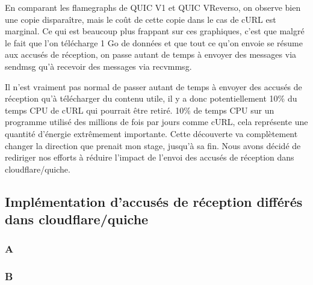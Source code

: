En comparant les flamegraphs de QUIC V1 et QUIC VReverso, on observe bien une copie disparaître, mais le coût de cette copie dans le cas de cURL est marginal. Ce qui est beaucoup plus frappant sur ces graphiques, c'est que malgré le fait que l'on télécharge 1 Go de données et que tout ce qu'on envoie se résume aux accusés de réception, on passe autant de temps à envoyer des messages via sendmsg qu'à recevoir des messages via recvmmsg.

\vspace{0.5cm}

Il n'est vraiment pas normal de passer autant de temps à envoyer des accusés de réception qu'à télécharger du contenu utile, il y a donc potentiellement 10\% du temps CPU de cURL qui pourrait être retiré. 10\% de temps CPU sur un programme utilisé des millions de fois par jours comme cURL, cela représente une quantité d'énergie extrêmement importante. Cette découverte va complètement changer la direction que prenait mon stage, jusqu'à sa fin. Nous avons décidé de rediriger nos efforts à réduire l'impact de l'envoi des accusés de réception dans cloudflare/quiche.

\newpage

\subsection{Implémentation d'accusés de réception différés dans cloudflare/quiche}

\subsubsection{A}

    \lipsum[1-2]

\subsubsection{B}

    \lipsum[1-2]